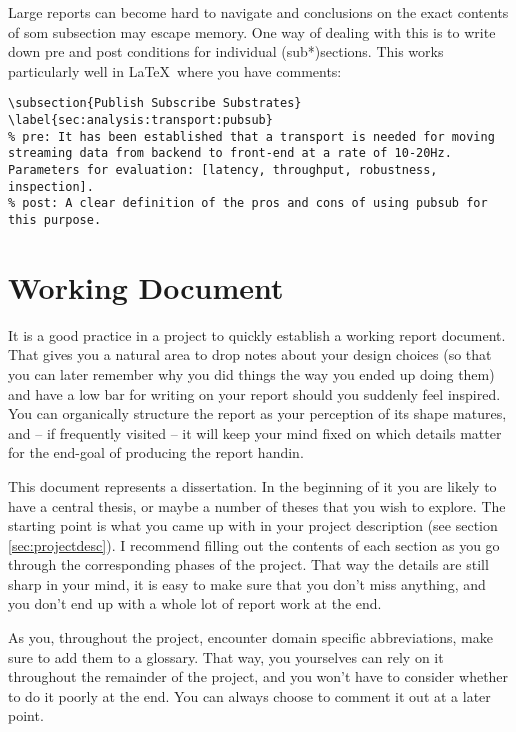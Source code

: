 \documentclass[a4paper, oneside]{memoir}
\newcommand{\idx}[1]{\index{#1}\marginpar{\raggedright \tiny #1}}
\begin{document}
Large reports can become hard to navigate and conclusions on the exact contents of som subsection may escape memory. One way of dealing with this is to write down pre and post conditions for individual (sub*)sections. This works particularly well in \LaTeX\ where you have comments:

\begin{verbatim}
\subsection{Publish Subscribe Substrates}
\label{sec:analysis:transport:pubsub}
% pre: It has been established that a transport is needed for moving streaming data from backend to front-end at a rate of 10-20Hz. Parameters for evaluation: [latency, throughput, robustness, inspection].
% post: A clear definition of the pros and cons of using pubsub for this purpose.
\end{verbatim}

\section{Working Document}

It is a good practice in a project to quickly establish a working report document. That gives you a natural area to drop notes about your design choices (so that you can later remember why you did things the way you ended up doing them) and have a low bar for writing on your report should you suddenly feel inspired. You can organically structure the report as your perception of its shape matures, and -- if frequently visited -- it will keep your mind fixed on which details matter for the end-goal of producing the report handin.

This document represents a dissertation. In the beginning of it you are likely to have a central thesis, or maybe a number of theses that you wish to explore. The starting point is what you came up with in your project description (see section \ref{sec:projectdesc}). I recommend filling out the contents of each section as you go through the corresponding phases of the project. That way the details are still sharp in your mind, it is easy to make sure that you don't miss anything, and you don't end up with a whole lot of report work at the end.

As you, throughout the project, encounter domain specific abbreviations, make sure to add them to a glossary\idx{Glossary}. That way, you yourselves can rely on it throughout the remainder of the project, and you won't have to consider whether to do it poorly at the end. You can always choose to comment it out at a later point.
\end{document}
